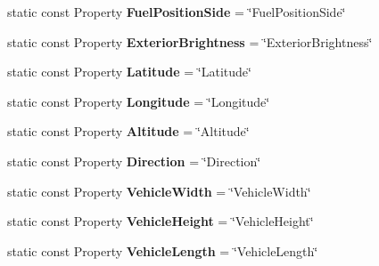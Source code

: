 \begin{DoxyCompactItemize}
\item 
\hypertarget{classVehicleProperty_a574a971800258aa3d53126ec01e85477}{static const Property {\bfseries Fuel\-Position\-Side} = \char`\"{}Fuel\-Position\-Side\char`\"{}}\label{classVehicleProperty_a574a971800258aa3d53126ec01e85477}

\item 
\hypertarget{classVehicleProperty_a490658c5e633ab54a5bbf11b5f38e994}{static const Property {\bfseries Exterior\-Brightness} = \char`\"{}Exterior\-Brightness\char`\"{}}\label{classVehicleProperty_a490658c5e633ab54a5bbf11b5f38e994}

\item 
\hypertarget{classVehicleProperty_a225bcbd3adba51c5d571a086a98f6b4f}{static const Property {\bfseries Latitude} = \char`\"{}Latitude\char`\"{}}\label{classVehicleProperty_a225bcbd3adba51c5d571a086a98f6b4f}

\item 
\hypertarget{classVehicleProperty_ac5565746cd2dfd2e3f8870d8e292b392}{static const Property {\bfseries Longitude} = \char`\"{}Longitude\char`\"{}}\label{classVehicleProperty_ac5565746cd2dfd2e3f8870d8e292b392}

\item 
\hypertarget{classVehicleProperty_a0411474f4450758ba2dbcdc136ef7391}{static const Property {\bfseries Altitude} = \char`\"{}Altitude\char`\"{}}\label{classVehicleProperty_a0411474f4450758ba2dbcdc136ef7391}

\item 
\hypertarget{classVehicleProperty_a89d7508f610bdbbeaaec742ee3d4f656}{static const Property {\bfseries Direction} = \char`\"{}Direction\char`\"{}}\label{classVehicleProperty_a89d7508f610bdbbeaaec742ee3d4f656}

\item 
\hypertarget{classVehicleProperty_a4e3c78c74cee15e4f0c8b5f1c11215e7}{static const Property {\bfseries Vehicle\-Width} = \char`\"{}Vehicle\-Width\char`\"{}}\label{classVehicleProperty_a4e3c78c74cee15e4f0c8b5f1c11215e7}

\item 
\hypertarget{classVehicleProperty_a0fde8e98bbffe557982301ecfbe595b1}{static const Property {\bfseries Vehicle\-Height} = \char`\"{}Vehicle\-Height\char`\"{}}\label{classVehicleProperty_a0fde8e98bbffe557982301ecfbe595b1}

\item 
\hypertarget{classVehicleProperty_a9f2d02d1ff69cf8547c6bf8b4ab20a93}{static const Property {\bfseries Vehicle\-Length} = \char`\"{}Vehicle\-Length\char`\"{}}\label{classVehicleProperty_a9f2d02d1ff69cf8547c6bf8b4ab20a93}


\end{DoxyCompactItemize}
